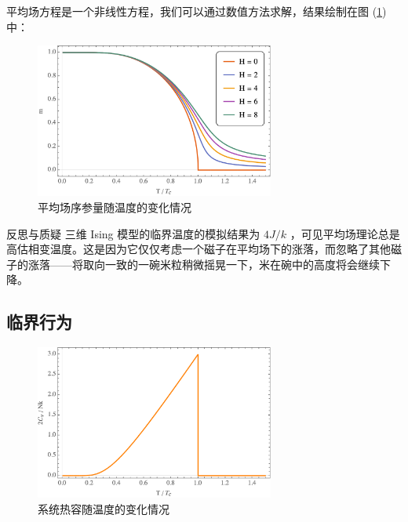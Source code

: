 平均场方程是一个非线性方程，我们可以通过数值方法求解，结果绘制在图 (\ref*{fig:one-dim-ising}) 中：
\begin{figure}[ht]
    \centering
    \includegraphics[width=0.7\textwidth]{figures/mean-field-mean-spin.png}
    \caption{\kaishu 平均场序参量随温度的变化情况}
    \label{fig:one-dim-ising}
\end{figure}

\begin{justification}{\kaishu 反思与质疑}
\kaishu \fontsize{11pt}{16pt}
\quad\quad 三维 Ising 模型的临界温度的模拟结果为 $4J/k $ ，可见平均场理论总是高估相变温度。这是因为它仅仅考虑一个磁子在平均场下的涨落，而忽略了其他磁子的涨落——将取向一致的一碗米粒稍微摇晃一下，米在碗中的高度将会继续下降。
\end{justification}

\subsection{临界行为}\label{sub:临界行为}

\begin{figure}[ht]
    \centering
    \includegraphics[width=0.7\textwidth]{figures/meanfield-heat-capacity.png}
    \caption{\kaishu 系统热容随温度的变化情况}
    \label{fig:sol-capa}
\end{figure}


